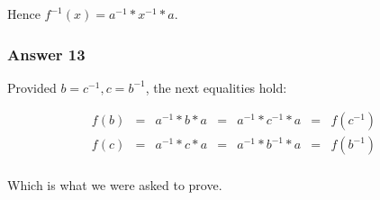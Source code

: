 \documentclass[11pt]{article}
\begin{document}
Hence $f^{-1}(x) = a^{-1} * x^{-1} * a$.
\subsubsection{Answer 13}
\label{sec-1-4-3}
Provided $b = c^{-1}, c = b^{-1}$, the next equalities hold:

\begin{equation*}
  \begin{array}{lllllll}
    f(b) & = & a^{-1} * b * a & = & a^{-1} * c^{-1} * a & = & f(c^{-1}) \\
    f(c) & = & a^{-1} * c * a & = & a^{-1} * b^{-1} * a & = & f(b^{-1}) \\
  \end{array}
\end{equation*}

Which is what we were asked to prove.
\end{document}
